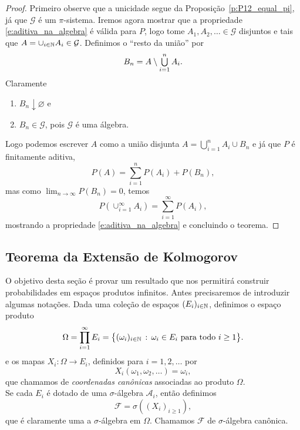 \begin{proof}
  Primeiro observe que a unicidade segue da Proposição~\ref{p:P12_equal_pi}, já que $\mathcal{G}$ é um $\pi$-sistema.
  Iremos agora mostrar que a propriedade \eqref{e:aditiva_na_algebra} é válida para $P$, logo tome $A_1, A_2, \dots \in \mathcal{G}$ disjuntos e tais que 
  $A = \cup_{i\in {\ensuremath{\mathbb N}}} A_i \in \mathcal{G}$.
  Definimos o ``resto da união'' por
  \begin{equation}
    B_n = A \setminus \operatorname*{{\textstyle \bigcup}}_{i=1}^n A_i.
  \end{equation}
  Claramente
  \begin{enumerate}[\quad a)]
  \item $B_n \downarrow \varnothing$ e
  \item $B_n \in \mathcal{G}$, pois $\mathcal{G}$ é uma álgebra.
  \end{enumerate}

  Logo podemos escrever $A$ como a união disjunta $A = \bigcup_{i=1}^n A_i \cup B_n$ e já que $P$ é finitamente aditiva,
  \begin{equation}
    P(A) = \sum_{i=1}^n P(A_i) + P(B_n),
  \end{equation}
  mas como $\lim_{n\to \infty} P(B_n) = 0$, temos $$P(\cup_{i=1}^{\infty} A_i) = \sum_{i=1}^{\infty} P(A_i),$$ mostrando a propriedade \eqref{e:aditiva_na_algebra} e concluindo o teorema.
\end{proof}

\subsection{Teorema da Extensão de Kolmogorov}

O objetivo desta seção é provar um resultado que nos permitirá construir probabilidades em espaços produtos infinitos.
Antes precisaremos de introduzir algumas notações.
Dada uma coleção de espaços $(E_i)_{i\in {\ensuremath{\mathbb N}}}$, definimos o espaço produto
\begin{equation}
  \Omega = \prod_{i=1}^{\infty} E_i = \big\{(\omega_i)_{i\in {\ensuremath{\mathbb N}}} \, : \,  \omega_i \in E_i \text{ para todo $i \geq 1$}\big\}.
\end{equation}
e os mapas $X_i:\Omega \to E_i$, definidos para $i = 1, 2, \dots$ por
\begin{equation}
  X_i(\omega_1, \omega_2, \dots) = \omega_i,
\end{equation}
que chamamos de \emph{coordenadas canônicas}  associadas ao produto $\Omega$.\\
Se cada $E_i$ é dotado de uma $\sigma$-álgebra $\mathcal{A}_i$, então definimos
\begin{equation}
  \mathcal{F} = \sigma( (X_i)_{i\geq 1} ),
\end{equation}
que é claramente uma a $\sigma$-álgebra em $\Omega$.
Chamamos $\mathcal{F}$ de $\sigma$-álgebra canônica.

